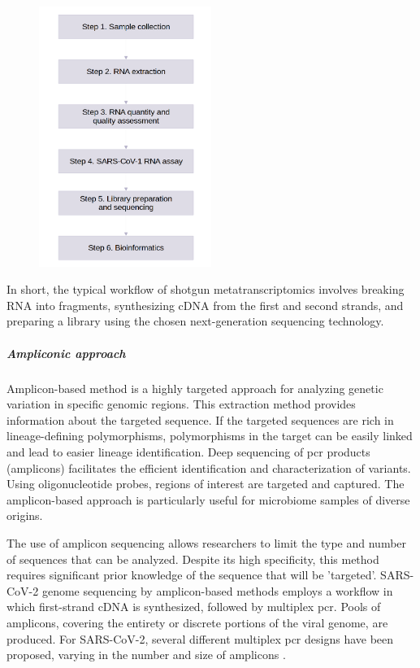         \begin{figure}[h]
        	\centering
            \includegraphics[width=0.5\textwidth]{figures/intro/metatranscriptomics-process.png}
            \label{fig:intro:metatr-process}
        \end{figure}
        
        In short, the typical workflow of shotgun metatranscriptomics involves breaking RNA into fragments, synthesizing cDNA from the first and second strands, and preparing a library using the chosen next-generation sequencing technology.

        \subparagraph{Ampliconic approach} 
        
        Amplicon-based method is a highly targeted approach for analyzing genetic variation in specific genomic regions. This extraction method provides information about the targeted sequence. If the targeted sequences are rich in lineage-defining polymorphisms, polymorphisms in the target can be easily linked and lead to easier lineage identification. Deep sequencing of \acrshort{pcr} products (amplicons) facilitates the efficient identification and characterization of variants. Using oligonucleotide probes, regions of interest are targeted and captured. The amplicon-based approach is particularly useful for microbiome samples of diverse origins.

        The use of amplicon sequencing allows researchers to limit the type and number of sequences that can be analyzed. Despite its high specificity, this method requires significant prior knowledge of the sequence that will be 'targeted’. SARS-CoV-2 genome sequencing by amplicon-based methods employs a workflow in which first-strand cDNA is synthesized, followed by multiplex \acrshort{pcr}. Pools of amplicons, covering the entirety or discrete portions of the viral genome, are produced. For SARS-CoV-2, several different multiplex \acrshort{pcr} designs have been proposed, varying in the number and size of amplicons \cite{chiara2020}.
        
